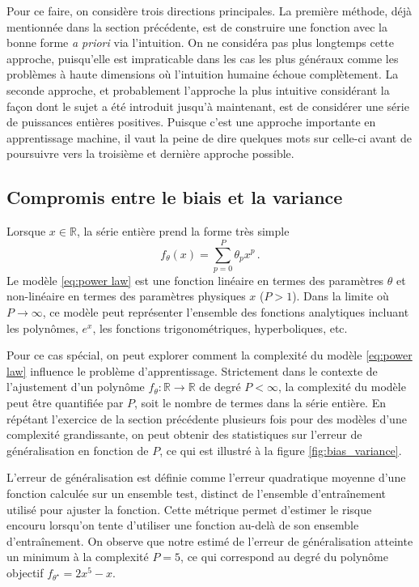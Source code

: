 Pour ce faire, on considère trois directions principales. 
La première méthode, déjà mentionnée dans la section précédente, est de construire une fonction avec la bonne forme \textit{a priori} via l'intuition.  
On ne considéra pas plus longtemps cette approche, puisqu'elle est impraticable dans les cas les plus généraux comme les problèmes à haute dimensions où l'intuition humaine échoue complètement.
La seconde approche, et probablement l'approche la plus intuitive considérant la façon dont le sujet a été introduit jusqu'à maintenant, est de considérer une série de puissances entières positives.
Puisque c'est une approche importante en apprentissage machine, il vaut la peine de dire quelques mots sur celle-ci avant de poursuivre vers la troisième 
et dernière approche possible. 

\subsection{Compromis entre le biais et la variance}
Lorsque $x \in \mathbb{R}$, la série entière prend la forme très simple
\begin{equation}\label{eq:power law}
        f_\theta(x) = \sum_{p = 0}^{P} \theta_p x^{p}\, .
\end{equation} 
Le modèle \eqref{eq:power law} est une fonction linéaire en termes des paramètres $\theta$ et non-linéaire en termes des paramètres physiques $x$ ($P > 1$). 
Dans la limite où $P \rightarrow \infty$, ce modèle 
peut représenter l'ensemble des fonctions analytiques incluant les polynômes, $e^x$, les fonctions trigonométriques, hyperboliques, etc. 

Pour ce cas spécial, on peut explorer comment la complexité du modèle \eqref{eq:power law} influence le problème d'apprentissage. Strictement dans le contexte de l'ajustement 
d'un polynôme $f_\theta: \mathbb{R} \rightarrow \mathbb{R}$ de degré $P < \infty$, la complexité du modèle peut être quantifiée par $P$, soit le nombre de termes dans 
la série entière. En répétant l'exercice de la section précédente plusieurs fois pour des modèles d'une complexité grandissante,
on peut obtenir des statistiques sur l'erreur de généralisation en fonction de $P$, ce qui est illustré à la figure \ref{fig:bias_variance}.

L'erreur de généralisation est définie comme l'erreur quadratique moyenne d'une fonction calculée sur un ensemble test, distinct de l'ensemble d'entraînement 
utilisé pour ajuster la fonction.
Cette métrique permet d'estimer le risque encouru lorsqu'on tente d'utiliser une fonction au-delà de son ensemble d'entraînement.
On observe que notre estimé de l'erreur de généralisation atteinte un minimum à la complexité $P=5$, ce qui correspond au degré du polynôme objectif $f_{\theta^{\star}} = 2x^5 - x$. 

